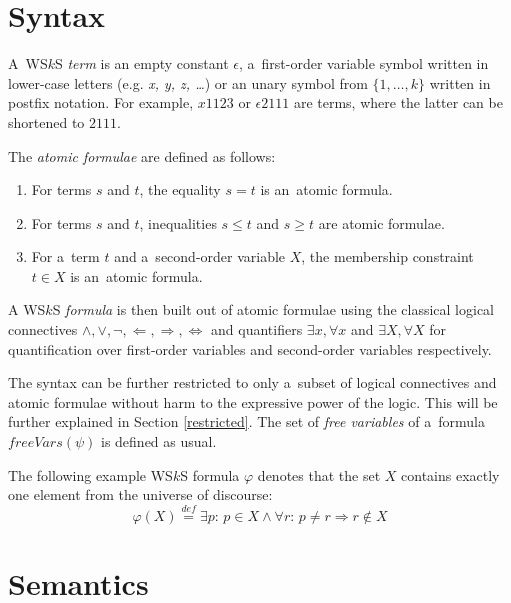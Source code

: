  \section{Syntax}
 A~WS$k$S \emph{term} is an empty constant $\epsilon$, a~first-order variable
 symbol written in lower-case letters (e.g. \emph{x, y, z, \ldots}) or an unary
 symbol from $\{1,\ldots,k\}$ written in postfix notation.
 For example, $x1123$ or $\epsilon2111$ are terms, where the latter can be
 shortened to $2111$.

The \emph{atomic formulae} are defined as follows:
 \begin{enumerate}
  \item For terms $s$ and $t$, the equality $s = t$ is an~atomic formula.
\item For terms $s$ and $t$, inequalities $s \leq t$ and $s \geq t$ are atomic
formulae.
\item For a~term $t$ and a~second-order variable $X$, the membership constraint
$t \in X$ is an~atomic formula.
 \end{enumerate}

A WS$k$S \emph{formula} is then built out of atomic formulae using the
classical logical connectives $\wedge, \vee, \neg, \Leftarrow, \Rightarrow,
\Leftrightarrow$ and quantifiers $\exists x, \forall x$ and $\exists X, \forall
X$ for quantification over first-order variables and second-order variables
respectively.

The syntax can be further restricted to only a~subset of logical connectives
and atomic formulae without harm to the expressive power of the logic. This will be
further explained in Section \ref{restricted}. The set of \emph{free variables}
of a~formula $\mathit{freeVars}(\psi)$ is defined as usual.
  
  \noindent\hrulefill
  \begin{example}
  The following example WS$k$S formula $\varphi$ denotes that the set $X$
  contains exactly one element from the universe of discourse:
  \begin{equation}
   \varphi(X) \overset{\mathit{def}}{=} \exists p:\,p \in X \wedge \forall r:\,
   p \neq r \Rightarrow r \not\in X
  \end{equation}
   \hrulefill
  \end{example}\label{wsks-formula}
  
  \section{Semantics}
	
